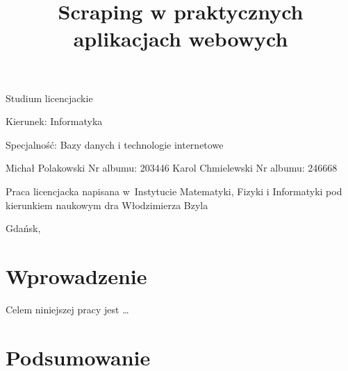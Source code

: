 \documentclass[12pt,a4paper,oneside,openany,parskip=full,parindent=full]{book}
\begin{document}
\begin{center}

\vspace{1cm}

Studium licencjackie
\end{center}

\vspace{1cm}

\noindent Kierunek: Informatyka

\noindent Specjalność: Bazy danych i technologie internetowe

\vspace{1cm}

{
\leftskip=10cm\noindent
Michał Polakowski\newline
Nr albumu: 203446\newline
Karol Chmielewski\newline
Nr albumu: 246668
}

\vspace{2cm}

\title{Scraping w praktycznych aplikacjach webowych}
\makeatletter

\begin{center}
\LARGE\bf
\@title
\end{center}

\vspace{2cm}

{
\leftskip=10cm\noindent
Praca licencjacka\newline 
napisana w~Instytucie Matematyki, Fizyki i Informatyki\newline
pod kierunkiem naukowym\newline
dra Włodzimierza Bzyla

}

\vfill

\begin{center}
Gdańsk, \the\year
\end{center}
\thispagestyle{empty}

\clearpage
\thispagestyle{empty}
\clearpage

\tableofcontents

\clearpage


\chapter{Wprowadzenie}

Celem niniejszej pracy jest \ldots



\chapter{Podsumowanie}



\clearpage
{}
\begin{thebibliography}{99}
\setlength{\itemsep}{0pt}

\end{thebibliography}

\clearpage
\end{document}
